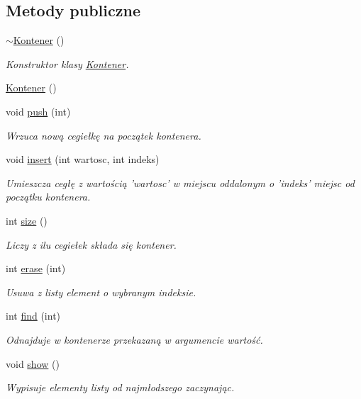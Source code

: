 \subsection*{Metody publiczne}
\begin{DoxyCompactItemize}
\item 
\hyperlink{classls_1_1_kontener_a52711b1bc80413d48840ce8071a427fa}{$\sim$\-Kontener} ()
\begin{DoxyCompactList}\small\item\em Konstruktor klasy \hyperlink{classls_1_1_kontener}{Kontener}. \end{DoxyCompactList}\item 
\hyperlink{classls_1_1_kontener_a1c8f0e384b9d8e945ee70354eb144657}{Kontener} ()
\item 
void \hyperlink{classls_1_1_kontener_a911b275202510df1f321f8da26f0aa34}{push} (int)
\begin{DoxyCompactList}\small\item\em Wrzuca nową cegiełkę na początek kontenera. \end{DoxyCompactList}\item 
void \hyperlink{classls_1_1_kontener_a09517b6ec268d37744b1abbc7b7df5bb}{insert} (int wartosc, int indeks)
\begin{DoxyCompactList}\small\item\em Umieszcza cegłę z wartością 'wartosc' w miejscu oddalonym o 'indeks' miejsc od początku kontenera. \end{DoxyCompactList}\item 
int \hyperlink{classls_1_1_kontener_a248ac01db2477296b265fb0ea07a8c1c}{size} ()
\begin{DoxyCompactList}\small\item\em Liczy z ilu cegiełek składa się kontener. \end{DoxyCompactList}\item 
int \hyperlink{classls_1_1_kontener_a3b9fed0ce54e6232bd2868bf4b3801ec}{erase} (int)
\begin{DoxyCompactList}\small\item\em Usuwa z listy element o wybranym indeksie. \end{DoxyCompactList}\item 
int \hyperlink{classls_1_1_kontener_a04841df56a29d488e5e0d1a292646dde}{find} (int)
\begin{DoxyCompactList}\small\item\em Odnajduje w kontenerze przekazaną w argumencie wartość. \end{DoxyCompactList}\item 
void \hyperlink{classls_1_1_kontener_a75014b0a40e25ac573e2242d50522e08}{show} ()
\begin{DoxyCompactList}\small\item\em Wypisuje elementy listy od najmłodszego zaczynając. \end{DoxyCompactList}\end{DoxyCompactItemize}
